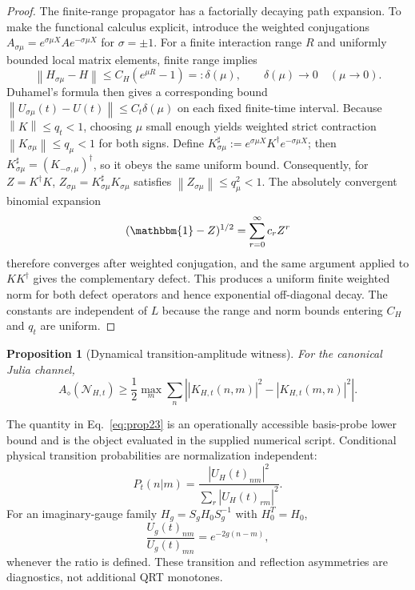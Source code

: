 \documentclass[reprint,amsmath,amssymb,aps,nofootinbib]{revtex4-2}
\newtheorem{proposition}{Proposition}
\newcommand{\id}{\mathbbm{1}}
\newcommand{\norm}[1]{\left\lVert #1\right\rVert}
\begin{document}
\begin{proof}
The finite-range propagator has a factorially decaying path expansion. To make the functional
calculus explicit, introduce the weighted conjugations
$A_{\sigma\mu}=e^{\sigma\mu X}Ae^{-\sigma\mu X}$ for $\sigma=\pm1$. For a
finite interaction range $R$ and uniformly bounded local matrix elements, finite range implies
\begin{equation}
\norm{H_{\sigma\mu}-H}\le C_H(e^{\mu R}-1)=:\delta(\mu),
\qquad \delta(\mu)\to0\quad(\mu\to0).
\end{equation}
Duhamel's formula then gives a corresponding bound
$\norm{U_{\sigma\mu}(t)-U(t)}\le C_t\delta(\mu)$ on each fixed finite-time interval.
Because $\norm K\le q_t<1$, choosing $\mu$ small enough yields weighted strict contraction
$\norm{K_{\sigma\mu}}\le q_\mu<1$ for both signs. Define
$K^{\sharp}_{\sigma\mu}:=e^{\sigma\mu X}K^\dagger e^{-\sigma\mu X}$; then
$K^{\sharp}_{\sigma\mu}=(K_{-\sigma,\mu})^\dagger$, so it obeys the same uniform bound.
Consequently, for $Z=K^\dagger K$,
$Z_{\sigma\mu}=K^{\sharp}_{\sigma\mu}K_{\sigma\mu}$ satisfies
$\norm{Z_{\sigma\mu}}\le q_\mu^2<1$. The absolutely convergent binomial expansion
\begin{equation}
(\id-Z)^{1/2}=\sum_{r=0}^{\infty}c_r Z^r
\end{equation}
therefore converges after weighted conjugation, and the same argument applied to $KK^\dagger$
gives the complementary defect. This produces a uniform finite weighted norm for both defect
operators and hence exponential off-diagonal decay. The constants are independent of $L$ because
the range and norm bounds entering $C_H$ and $q_t$ are uniform.
\end{proof}

\begin{proposition}[Dynamical transition-amplitude witness]
For the canonical Julia channel,
\begin{equation}
\boxed{
A_\diamond(\mathcal N_{H,t})\ge
\frac12\max_m\sum_n
\left||K_{H,t}(n,m)|^2-|K_{H,t}(m,n)|^2\right|.}
\label{eq:prop23}
\end{equation}
\end{proposition}

The quantity in Eq.~\eqref{eq:prop23} is an operationally accessible basis-probe lower bound and
is the object evaluated in the supplied numerical script. Conditional physical transition
probabilities are normalization independent:
\begin{equation}
P_t(n|m)=
\frac{|U_H(t)_{nm}|^2}{\sum_r|U_H(t)_{rm}|^2}.
\end{equation}
For an imaginary-gauge family $H_g=S_gH_0S_g^{-1}$ with $H_0^T=H_0$,
\begin{equation}
\frac{U_g(t)_{nm}}{U_g(t)_{mn}}=e^{-2g(n-m)},
\end{equation}
whenever the ratio is defined. These transition and reflection asymmetries are diagnostics, not
additional QRT monotones.
\end{document}
